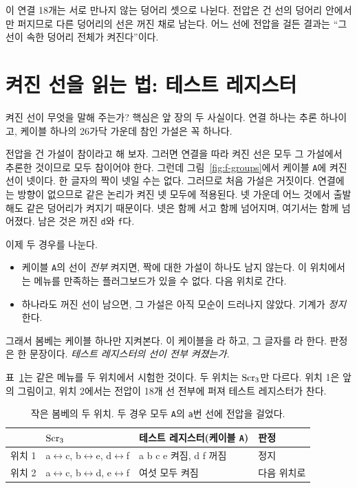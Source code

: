 이 연결 18개는 서로 만나지 않는 덩어리 셋으로 나뉜다. 전압은 건 선의 덩어리 안에서만 퍼지므로 다른 덩어리의
선은 꺼진 채로 남는다. 어느 선에 전압을 걸든 결과는 ``그 선이 속한 덩어리 전체가 켜진다''이다.

\section{켜진 선을 읽는 법: 테스트 레지스터}\label{sec:f-register}

켜진 선이 무엇을 말해 주는가? 핵심은 앞 장의 두 사실이다. 연결 하나는 추론 하나이고, 케이블 하나의 26가닥
가운데 참인 가설은 꼭 하나다.

\Why 전압을 건 가설이 참이라고 해 보자. 그러면 연결을 따라 켜진 선은 모두 그 가설에서 추론한 것이므로 모두
참이어야 한다. 그런데 그림~\ref{fig:f-groups}에서 케이블 \texttt{A}에 켜진 선이 넷이다. 한 글자의 짝이 넷일 수는
없다. 그러므로 처음 가설은 거짓이다. 연결에는 방향이 없으므로 같은 논리가 켜진 넷 모두에 적용된다. 넷 가운데
어느 것에서 출발해도 같은 덩어리가 켜지기 때문이다. 넷은 함께 서고 함께 넘어지며, 여기서는 함께 넘어졌다.
남은 것은 꺼진 \texttt{d}와 \texttt{f}다.

이제 두 경우를 나눈다.

\begin{itemize}
\item 케이블 \texttt{A}의 선이 \emph{전부} 켜지면, 짝에 대한 가설이 하나도 남지 않는다. 이 위치에서는 메뉴를 만족하는
플러그보드가 있을 수 없다. 다음 위치로 간다.
\item 하나라도 꺼진 선이 남으면, 그 가설은 아직 모순이 드러나지 않았다. 기계가 \emph{정지}한다.
\end{itemize}

그래서 봄베는 케이블 하나만 지켜본다. 이 케이블을 라 하고, 그 글자를
라 한다. 판정은 한 문장이다. \emph{테스트 레지스터의 선이 전부 켜졌는가.}

표~\ref{tab:f-two}는 같은 메뉴를 두 위치에서 시험한 것이다. 두 위치는 $\mathrm{Scr}_3$만 다르다. 위치 1은 앞의 그림이고,
위치 2에서는 전압이 18개 선 전부에 퍼져 테스트 레지스터가 찬다.

\begin{table}[ht]
\centering
\caption{작은 봄베의 두 위치. 두 경우 모두 \texttt{A}의 \texttt{a}번 선에 전압을 걸었다.}
\label{tab:f-two}
\small
\begin{tabular}{l l l l}
\toprule
& $\mathrm{Scr}_3$ & 테스트 레지스터(케이블 \texttt{A}) & 판정 \\
\midrule
위치 1 & a$\leftrightarrow$c, b$\leftrightarrow$e, d$\leftrightarrow$f & a b c e 켜짐, d f 꺼짐 & 정지 \\
위치 2 & a$\leftrightarrow$c, b$\leftrightarrow$d, e$\leftrightarrow$f & 여섯 모두 켜짐 & 다음 위치로 \\
\bottomrule
\end{tabular}
\end{table}

